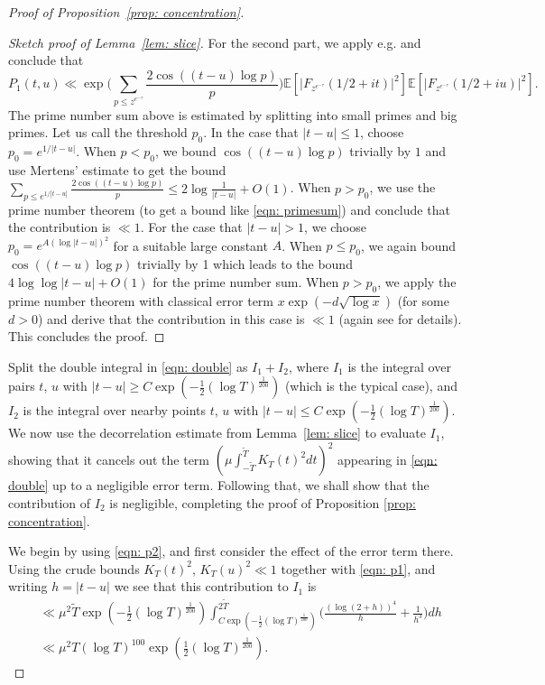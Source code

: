 \documentclass[12pt, notitlepage]{amsart}
\numberwithin{equation}{section}
\def\E{\mathbb E}
\def\TT{\widetilde{T}}
\theoremstyle{remark}
\theoremstyle{definition}
\theoremstyle{remark}
\numberwithin{equation}{section}
\begin{document}
\begin{proof}[Proof of Proposition~\ref{prop: concentration}]
\begin{proof}[Sketch proof of Lemma~\ref{lem: slice}]
For the second part, we apply e.g. \cite[display (6)]{HarperLow} and conclude that 
\[
P_1(t, u)\ll \exp\Big(\sum_{p\le z^{e^{-\tau}}}\frac{2\cos((t-u)\log p)}{p}\Big) \E[ |F_{z^{e^{-\tau}}}(1/2+it)|^{2} ] \E[ |F_{z^{e^{-\tau}}}(1/2+iu)|^{2}  ].
 \]
The prime number sum above is estimated by splitting into small primes and big primes. Let us call the threshold $p_0$.
In the case that $|t-u|\le 1$, choose $p_0 = e^{1/|t-u|}$. When $p<p_0$, we bound $\cos((t-u)\log p)$ trivially by $1$ and use Mertens' estimate to get the bound 
$\sum_{p\le e^{1/|t-u|}}\frac{2\cos((t-u)\log p)}{p} \leq 2\log \frac{1}{|t-u|} + O(1)$. When $p>p_0$, we use the prime number theorem (to get a bound like \eqref{eqn: primesum}) and conclude that the contribution is $\ll 1$.  For the case that $|t-u|>1$, we choose $p_0 = e^{A(\log |t-u|)^{2}}$ for a suitable large constant $A$. When $p\le p_0$, we again bound $\cos((t-u) \log p)$ trivially by 1 which leads to the bound $4\log \log |t-u| + O(1)$ for the prime number sum. When $p>p_0$, we apply the prime number theorem with classical error term $x\exp(-d\sqrt{\log x})$ (for some $d>0$) and derive that the contribution in this case is $\ll 1$ (again see \cite[Number Theory Result 2]{Harperlargevalue} for details). This concludes the proof.
\end{proof}


Split the double integral in \eqref{eqn: double} as $I_1 + I_2$, where $I_1$ is the integral over pairs $t$, $u$ with $|t-u| \ge C\exp(-\tfrac 12 (\log T)^{\frac 1{200}})$ (which is the typical case), and $I_2$ is the integral over nearby points $t$, $u$ with $|t-u| \le C\exp(-\tfrac 12 (\log T)^{\frac 1{200}})$.   We now use 
 the decorrelation estimate from Lemma~\ref{lem: slice} to evaluate $I_1$, showing that it cancels out the term $(\mu \int_{-\TT}^{\TT} K_T(t)^2 dt)^2$ appearing in 
 \eqref{eqn: double} up to a negligible error term.  Following that, we shall show that the contribution of $I_2$ is negligible, completing the proof of Proposition \ref{prop: concentration}.
 
 
 We begin by using \eqref{eqn: p2}, and first consider the effect of the error term there.  Using the crude bounds $K_T(t)^2$, $K_T(u)^2\ll 1$ together with \eqref{eqn: p1}, and writing $h = |t-u|$ we see that this contribution to $I_1$ is 
 \begin{align*} 
& \ll \mu^2 \TT \exp(-\tfrac 12 (\log T)^{\frac{1}{200}}) \int_{C\exp(-\frac 12(\log T)^{\frac 1{200}})}^{2\TT} \Big( \frac{(\log (2+h))^4}{h} +\frac{1}{h^3}\Big) dh 
 \\
 &\ll \mu^2 T (\log T)^{100}  \exp(\tfrac 12 (\log T)^{\frac{1}{200}}). 
 \end{align*}
 

\end{proof}
\end{document}
